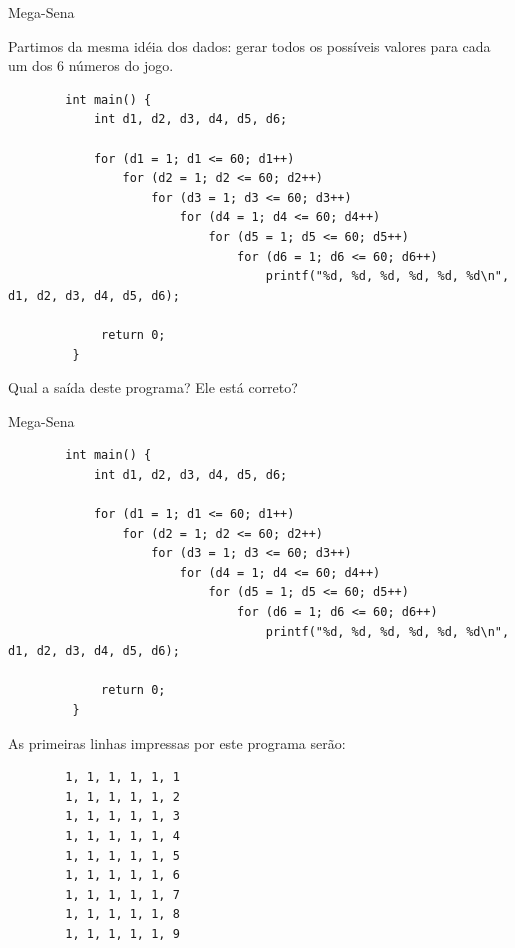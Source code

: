 \documentclass[handout]{beamer}
\begin{document}
\begin{frame}[fragile]{Mega-Sena}
        
    Partimos da mesma idéia dos dados: gerar todos os possíveis valores para cada um dos 6 números do jogo.

    \begin{verbatim}
        int main() {
            int d1, d2, d3, d4, d5, d6;

            for (d1 = 1; d1 <= 60; d1++)
                for (d2 = 1; d2 <= 60; d2++)
                    for (d3 = 1; d3 <= 60; d3++)
                        for (d4 = 1; d4 <= 60; d4++)
                            for (d5 = 1; d5 <= 60; d5++)
                                for (d6 = 1; d6 <= 60; d6++)
                                    printf("%d, %d, %d, %d, %d, %d\n", d1, d2, d3, d4, d5, d6);

             return 0;
         }
     \end{verbatim}

    Qual a saída deste programa? Ele está correto?
\end{frame}

\begin{frame}[fragile]{Mega-Sena}

    \begin{verbatim}
        int main() {
            int d1, d2, d3, d4, d5, d6;

            for (d1 = 1; d1 <= 60; d1++)
                for (d2 = 1; d2 <= 60; d2++)
                    for (d3 = 1; d3 <= 60; d3++)
                        for (d4 = 1; d4 <= 60; d4++)
                            for (d5 = 1; d5 <= 60; d5++)
                                for (d6 = 1; d6 <= 60; d6++)
                                    printf("%d, %d, %d, %d, %d, %d\n", d1, d2, d3, d4, d5, d6);

             return 0;
         }
    \end{verbatim}

    \small
    As primeiras linhas impressas por este programa serão:
    \begin{verbatim}
        1, 1, 1, 1, 1, 1
        1, 1, 1, 1, 1, 2
        1, 1, 1, 1, 1, 3
        1, 1, 1, 1, 1, 4
        1, 1, 1, 1, 1, 5
        1, 1, 1, 1, 1, 6
        1, 1, 1, 1, 1, 7
        1, 1, 1, 1, 1, 8
        1, 1, 1, 1, 1, 9
    \end{verbatim}
\end{frame}
\end{document}
